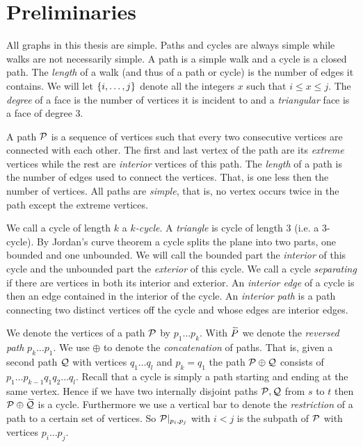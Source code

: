 
\section{Preliminaries}
All graphs in this thesis are simple. Paths and cycles are always simple while walks are not necessarily simple. A path is a simple walk and a cycle is a closed path.
The \emph{length} of a walk (and thus of a path or cycle) is the number of edges it contains.
We will let $\braces {i, \ldots, j}$ denote all the integers $x$ such that $i \leq x \leq j$.
The \emph{degree} of a face is the number of vertices it is incident to and a \emph{triangular} face is a face of degree $3$.

  A path $\P$ is a sequence of vertices such that every two consecutive vertices are connected with each other. The first and last vertex of the path are its \emph{extreme} vertices while the rest are \emph{interior} vertices of this path. The \emph{length} of a path is the number of edges used to connect the vertices. That, is one less then the number of vertices. All paths are \emph{simple}, that is, no vertex occurs twice in the path except the extreme vertices.

  We call a cycle of length $k$  a \emph{$k$-cycle}. A \emph{triangle} is cycle of length $3$ (i.e. a $3$-cycle).
  By Jordan's curve theorem a cycle splits the plane into two parts, one bounded and one unbounded. We will call the bounded part the \emph{interior} of this cycle and the unbounded part the \emph{exterior} of this cycle.
  We call a cycle \emph{separating} if there are vertices in both its interior and exterior.
  An \emph{interior edge} of a cycle is then an edge contained in the interior of the cycle.
  An \emph{interior path} is a path connecting two distinct vertices off the cycle and whose edges are interior edges.

  We denote the vertices of a path $\P$ by $p_1 \ldots p_k$.
  With $\rev{P}$ we denote the \emph{reversed path} $p_k \ldots p_1$. We use $\oplus$ to denote the \emph{concatenation} of paths. That is, given a second path $\Q$ with vertices $q_1 \ldots q_l$ and $p_k = q_1$ the path $\P \oplus \Q$ consists of $p_1 \ldots p_{k-1} q_1 q_2 \ldots q_l$.
  Recall that a cycle is simply a path starting and ending at the same vertex. Hence if we have two  internally disjoint paths $\P, \Q$ from $s$ to $t$ then $\P \oplus \rev{\Q}$ is a cycle.
  Furthermore we use a vertical bar to denote the \emph{restriction} of a path to a certain set of vertices. So $\P|_{p_i, p_j}$ with $i<j$ is the subpath of $\P$ with vertices $p_i \ldots p_j$.

